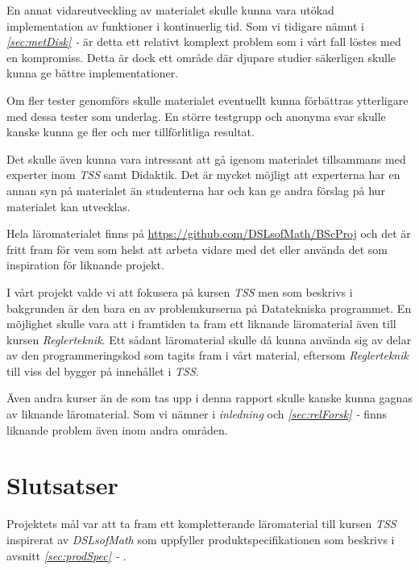 \documentclass[12pt,a4paper,twoside,openright]{article}
\begin{document}
En annat vidareutveckling av materialet skulle kunna vara utökad
implementation av funktioner i kontinuerlig tid. Som vi tidigare nämnt
i \textit{\ref{sec:metDisk} - } är detta ett relativt komplext problem
som i vårt fall löstes med en kompromiss. Detta är dock ett område där
djupare studier säkerligen skulle kunna ge bättre implementationer.

Om fler tester genomförs skulle materialet eventuellt kunna förbättras
ytterligare med dessa tester som underlag. En större testgrupp och
anonyma svar skulle kanske kunna ge fler och mer tillförlitliga
resultat.

Det skulle även kunna vara intressant att gå igenom materialet
tillsammans med experter inom \textit{TSS} samt Didaktik. Det är
mycket möjligt att experterna har en annan syn på materialet än
studenterna har och kan ge andra förslag på hur materialet kan
utvecklas.

Hela läromaterialet finns på \url{https://github.com/DSLsofMath/BScProj} och det är
fritt fram för vem som helst att arbeta vidare med det eller använda
det som inspiration för liknande projekt.

I vårt projekt valde vi att fokusera på kursen \textit{TSS} men som
beskrivs i bakgrunden är den bara en av problemkurserna på
Datatekniska programmet. En möjlighet skulle vara att i framtiden ta
fram ett liknande läromaterial även till kursen
\textit{Reglerteknik}. Ett sådant läromaterial skulle då kunna använda
sig av delar av den programmeringskod som tagits fram i vårt material,
eftersom \textit{Reglerteknik} till viss del bygger på innehållet i
\textit{TSS}.

Även andra kurser än de som tas upp i denna rapport skulle kanske
kunna gagnas av liknande läromaterial. Som vi nämner i
\textit{inledning} och \textit{\ref{sec:relForsk} - }
finns liknande problem även inom andra områden.


\section{Slutsatser}

Projektets mål var att ta fram ett kompletterande läromaterial till
kursen \textit{TSS} inspirerat av \textit{DSLsofMath} som uppfyller
produktspecifikationen som beskrivs i avsnitt \textit{\ref{sec:prodSpec} - }.
\end{document}
